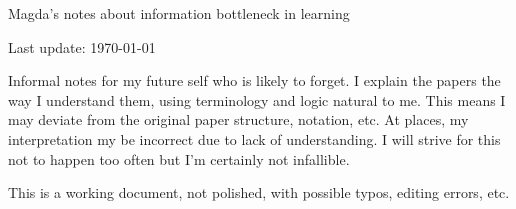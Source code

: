 \documentclass[a4paper, oneside]{article}
\begin{document}
\setlength{\parindent}{0pt}
\setlength{\parskip}{1ex plus 0.5ex minus 0.2ex}


{\large Magda's notes about information bottleneck in learning}

{\hfill Last update: \today}

Informal notes for my future self who is likely to forget.
I explain the papers the way I understand them, using terminology and logic natural to me.
This means I may deviate from the original paper structure, notation, etc.
At places, my interpretation my be incorrect due to lack of understanding. 
I will strive for this not to happen too often but I'm certainly not infallible. 

This is a working document, not  polished, with possible typos, editing errors, etc. 


\tableofcontents














\clearpage 
\printbibliography



\cleardoublepage
{}
\printindex
\end{document}
